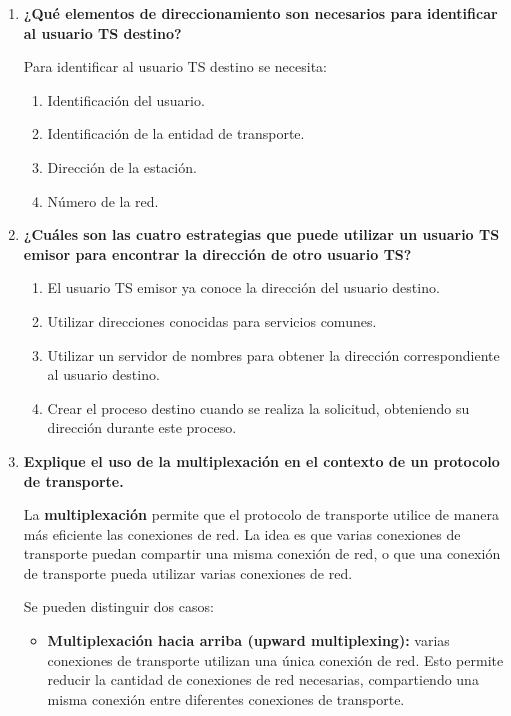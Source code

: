 \documentclass[11pt,a4paper]{article}
\begin{document}
\begin{enumerate}[label=20.\arabic*, start=1, itemsep=0.3cm]
  \item
      \textbf{¿Qué elementos de direccionamiento son necesarios para identificar al usuario TS destino?}

    Para identificar al usuario TS destino se necesita:

    \begin{enumerate}
        \item Identificación del usuario.
        \item Identificación de la entidad de transporte.
        \item Dirección de la estación.
        \item Número de la red.
    \end{enumerate}
  \item
    \textbf{¿Cuáles son las cuatro estrategias que puede utilizar un usuario TS emisor para encontrar la dirección de otro usuario TS?}

    \begin{enumerate}
        \item El usuario TS emisor ya conoce la dirección del usuario destino.
      \item Utilizar direcciones conocidas para servicios comunes.
      \item Utilizar un servidor de nombres para obtener la dirección correspondiente al usuario destino.
      \item Crear el proceso destino cuando se realiza la solicitud, obteniendo su dirección durante este proceso.
    \end{enumerate}

  \item
  \textbf{Explique el uso de la multiplexación en el contexto de un protocolo de transporte.}

    La \textbf{multiplexación} permite que el protocolo de transporte utilice de manera más eficiente las conexiones de red. La idea es que varias conexiones de transporte puedan compartir una misma conexión de red, o que una conexión de transporte pueda utilizar varias conexiones de red.

    Se pueden distinguir dos casos:

    \begin{itemize}
    \item \textbf{Multiplexación hacia arriba (upward multiplexing):} varias conexiones de transporte utilizan una única conexión de red. Esto permite reducir la cantidad de conexiones de red necesarias, compartiendo una misma conexión entre diferentes conexiones de transporte.


\end{itemize}
\end{enumerate}
\end{document}
